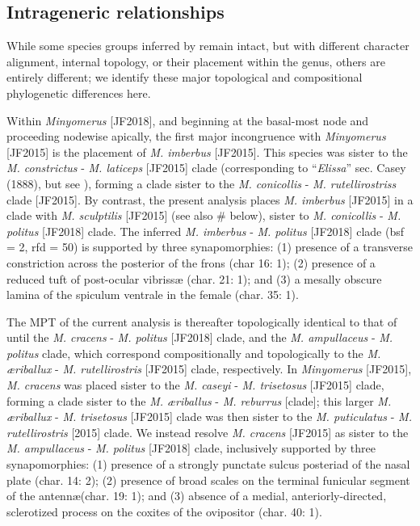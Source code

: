 \documentclass[fleqn,10pt,lineno]{wlpeerj} %
\begin{document}
	\subsection*{Intrageneric relationships}
		While some species groups inferred by \citet{jansen2015} remain intact, but with different character alignment, internal topology, or their placement within the genus, others are entirely different; we identify these major topological and compositional phylogenetic differences here.
		
		Within \textit{Minyomerus} [JF2018], and beginning at the basal-most node and proceeding nodewise apically, the first major incongruence with \textit{Minyomerus} [JF2015] is the placement of \textit{M. imberbus} [JF2015]. 
		This species was sister to the \textit{M. constrictus} - \textit{M. laticeps} [JF2015] clade (corresponding to ``\textit{Elissa}'' sec. Casey (1888), but see \citealt{jansen2015}), forming a clade sister to the \textit{M. conicollis} - \textit{M. rutellirostriss} clade [JF2015].
		By contrast, the present analysis places \textit{M. imberbus} [JF2015] in a clade with \textit{M. sculptilis} [JF2015] (see also \# below), sister to \textit{M. conicollis} - \textit{M. politus} [JF2018] clade.
		The inferred \textit{M. imberbus} - \textit{M. politus} [JF2018] clade (bsf = 2, rfd = 50) is supported by three synapomorphies: (1) presence of a transverse constriction across the posterior of the frons (char 16: 1); (2) presence of a reduced tuft of post-ocular vibriss{\ae} (char. 21: 1); and (3) a mesally obscure lamina of the spiculum ventrale in the female (char. 35: 1).
		
		The MPT of the current analysis is thereafter topologically identical to that of \citet{jansen2015} until the \textit{M. cracens} - \textit{M. politus} [JF2018] clade, and the \textit{M. ampullaceus} - \textit{M. politus} clade, which correspond compositionally and topologically to the \textit{M. {\ae}riballux} - \textit{M. rutellirostris} [JF2015] clade, respectively.
		In \textit{Minyomerus} [JF2015], \textit{M. cracens} was placed sister to the \textit{M. caseyi} - \textit{M. trisetosus} [JF2015] clade, forming a clade sister to the \textit{M. {\ae}riballus} - \textit{M. reburrus} [clade]; this larger \textit{M. {\ae}riballux} - \textit{M. trisetosus} [JF2015] clade was then sister to the \textit{M. puticulatus} - \textit{M. rutellirostris} [2015] clade.
		We instead resolve \textit{M. cracens} [JF2015] as sister to the \textit{M. ampullaceus} - \textit{M. politus} [JF2018] clade, inclusively supported by three synapomorphies: (1) presence of a strongly punctate sulcus posteriad of the nasal plate (char. 14: 2); (2) presence of broad scales on the terminal funicular segment of the antenn{\ae}(char. 19: 1); and (3) absence of a medial, anteriorly-directed, sclerotized process on the coxites of the ovipositor (char. 40: 1).
		
\end{document}
